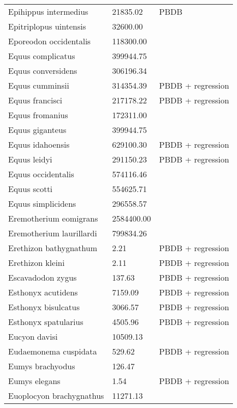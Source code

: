 \documentclass{article}
\begin{document}
\begin{center}
\begin{longtable}{p{} p{} p{}}
    Epihippus intermedius & 21835.02 & PBDB \\ 
    Epitriplopus uintensis & 32600.00 & \cite{MacFadden1986} \\ 
    Eporeodon occidentalis & 118300.00 & \cite{McKenna2011} \\ 
    Equus complicatus & 399944.75 & \cite{Smith2004} \\ 
    Equus conversidens & 306196.34 & \cite{Smith2004} \\ 
    Equus cumminsii & 314354.39 & PBDB + regression \\ 
    Equus francisci & 217178.22 & PBDB + regression \\ 
    Equus fromanius & 172311.00 & \cite{McKenna2011} \\ 
    Equus giganteus & 399944.75 & \cite{Smith2004} \\ 
    Equus idahoensis & 629100.30 & PBDB + regression \\ 
    Equus leidyi & 291150.23 & PBDB + regression \\ 
    Equus occidentalis & 574116.46 & \cite{Smith2004} \\ 
    Equus scotti & 554625.71 & \cite{Smith2004} \\ 
    Equus simplicidens & 296558.57 & \cite{Tomiya2013} \\ 
    Eremotherium eomigrans & 2584400.00 & \cite{McDonald2005} \\ 
    Eremotherium laurillardi & 799834.26 & \cite{Smith2004} \\ 
    Erethizon bathygnathum & 2.21 & PBDB + regression \\ 
    Erethizon kleini & 2.11 & PBDB + regression \\ 
    Escavadodon zygus & 137.63 & PBDB + regression \\ 
    Esthonyx acutidens & 7159.09 & PBDB + regression \\ 
    Esthonyx bisulcatus & 3066.57 & PBDB + regression \\ 
    Esthonyx spatularius & 4505.96 & PBDB + regression \\ 
    Eucyon davisi & 10509.13 & \cite{Tomiya2013} \\ 
    Eudaemonema cuspidata & 529.62 & PBDB + regression \\ 
    Eumys brachyodus & 126.47 & \cite{Tomiya2013} \\ 
    Eumys elegans & 1.54 & PBDB + regression \\ 
    Euoplocyon brachygnathus & 11271.13 & \cite{Tomiya2013} \\ 

\end{longtable}
\end{center}
\end{document}
